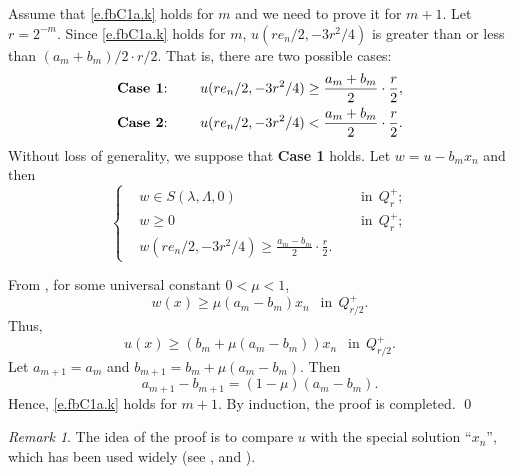 \documentclass[preprint,12pt]{elsarticle}
\theoremstyle{definition}
\theoremstyle{remark}
\newtheorem{remark}[theorem]{Remark}
\numberwithin{equation}{section}
\begin{document}
Assume that \cref{e.fbC1a.k} holds for $m$ and we need to prove it for $m+1$. Let $r=2^{-m}$. Since \cref{e.fbC1a.k} holds for $m$, $u(re_n/2,-3r^2/4)$ is greater than  or less than $(a_m+b_m)/2\cdot r/2$. That is, there are two possible cases:
\begin{equation*}
\begin{aligned}
&\mbox{\textbf{Case 1}:}~~&&~~u(re_n/2,-3r^2/4)\geq \frac{a_m+b_m}{2}\cdot \frac{r}{2},\\
&\mbox{\textbf{Case 2}:}~~&&~~u(re_n/2,-3r^2/4)< \frac{a_m+b_m}{2}\cdot \frac{r}{2}.
\end{aligned}
\end{equation*}
Without loss of generality, we suppose that \textbf{Case 1} holds. Let $w=u-b_mx_n$ and then
\begin{equation*}
  \left\{\begin{aligned}
    &w\in S(\lambda,\Lambda,0)&& ~~\mbox{in}~~Q_{r}^+;\\
    &w\geq 0&& ~~\mbox{in}~~Q_{r}^+;\\
    &w(re_n/2,-3r^2/4)\geq \frac{a_m-b_m}{2}\cdot \frac{r}{2}.
  \end{aligned}\right.
\end{equation*}

From , for some universal constant $0<\mu<1$,
\begin{equation*}\label{e.fbC1a-w}
w(x)\geq \mu(a_m-b_m)x_n~~\mbox{ in}~~Q_{r/2}^+.
\end{equation*}
Thus,
\begin{equation*}\label{e.fbC1a-w2}
u(x)\geq (b_m+\mu(a_m-b_m))x_n~~\mbox{ in}~~Q_{r/2}^+.
\end{equation*}
Let $a_{m+1}=a_m$ and $b_{m+1}=b_m+\mu(a_m-b_m)$. Then
\begin{equation*}\label{e.reg-ak}
a_{m+1}-b_{m+1}=(1-\mu)(a_m-b_m).
\end{equation*}
Hence, \cref{e.fbC1a.k} holds for $m+1$. By induction, the proof is completed. \qed~\\

\begin{remark}\label{re.flatC1a.1}
The idea of the proof is to compare $u$ with the special solution ``$x_n$'', which has been used widely (see \cite[Theorem 2.1]{MR1139064}, \cite[Lemma 2.12]{MR_Israel} and \cite[Theorem 1.4]{MR_cones}).
\end{remark}
\end{document}
